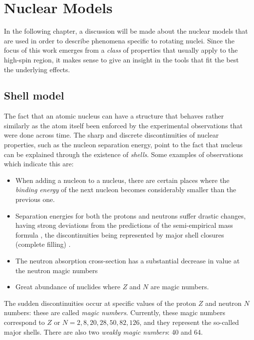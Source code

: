 \chapter{Nuclear Models}
\label{chapter-3}

In the following chapter, a discussion will be made about the nuclear models that are used in order to describe phenomena specific to rotating nuclei. Since the focus of this work emerges from a \emph{class} of properties that usually apply to the high-spin region, it makes sense to give an insight in the tools that fit the best the underlying effects.

\section{Shell model}

The fact that an atomic nucleus can have a structure that behaves rather similarly as the atom itself been enforced by the experimental observations that were done across time. The sharp and discrete discontinuities of nuclear properties, such as the nucleon separation energy, point to the fact that nucleus can be explained through the existence of \emph{shells}. Some examples of observations which indicate this are:
\begin{itemize}
    \item When adding a nucleon to a nucleus, there are certain places where the \emph{binding energy} of the next nucleon becomes considerably smaller than the previous one. 
    \item Separation energies for both the protons and neutrons suffer drastic changes, having strong deviations from the predictions of the semi-empirical mass formula \cite{weizsacker1935theorie}, the discontinuities being represented by major shell closures (complete filling) \cite{krane1991introductory}.
    \item The neutron absorption cross-section has a substantial decrease in value at the neutron magic numbers
    \item Great abundance of nuclides where $Z$ and $N$ are magic numbers.
\end{itemize}

The sudden discontinuities occur at specific values of the proton $Z$ and neutron $N$ numbers: these are called \emph{magic numbers}. Currently, these magic numbers correspond to $Z$ or $N=2,8,20,28,50,82,126$, and they represent the so-called major shells. There are also two \emph{weakly magic numbers}: 40 and 64.

